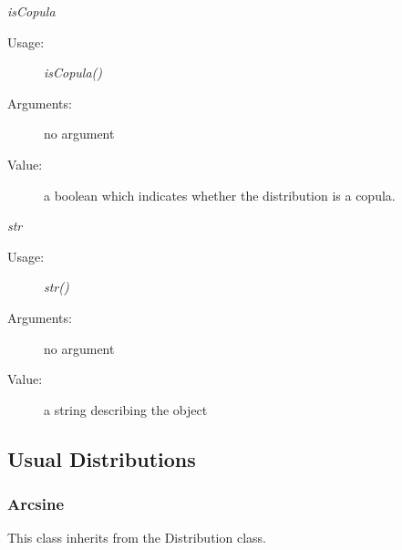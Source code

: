 \begin{description}
\begin{description}
\item \textit{isCopula}
\begin{description}
\item[Usage:] \textit{isCopula()}
\item[Arguments:] no argument
\item[Value:] a boolean which indicates whether the distribution is a copula.
\end{description}
\bigskip

\item \textit{str}
\begin{description}
\item[Usage:] \textit{str()}
\item[Arguments:] no argument
\item[Value:] a string describing the object
\end{description}
\bigskip

\end{description}

\end{description}

\newpage
\subsection{Usual Distributions} \label{UsualDistributions}


\subsubsection{Arcsine}

This class inherits from the Distribution class.

